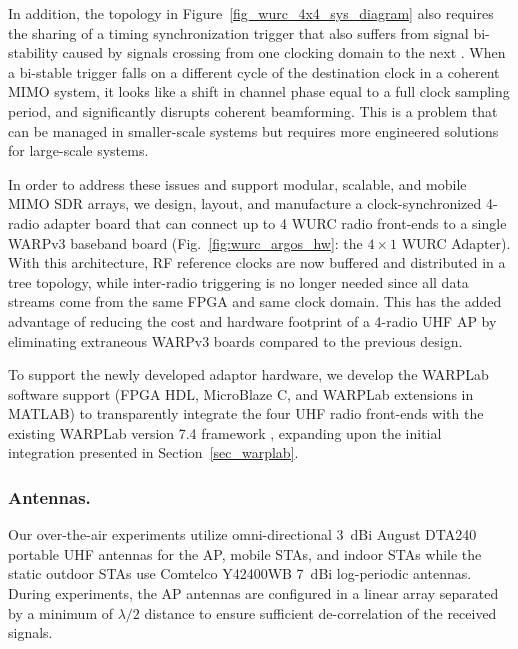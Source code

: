 	In addition, the topology in Figure~\ref{fig_wurc_4x4_sys_diagram} also requires the sharing of a timing synchronization trigger that also suffers from signal bi-stability caused by signals crossing from one clocking domain to the next \cite{cummings2008clock}.
	When a bi-stable trigger falls on a different cycle of the destination clock in a coherent \ac{MIMO} system, it looks like a shift in channel phase equal to a full clock sampling period, and significantly disrupts coherent beamforming.
	This is a problem that can be managed in smaller-scale systems but requires more engineered solutions for large-scale systems.

	In order to address these issues and support modular, scalable, and mobile \ac{MIMO} \ac{SDR} arrays, we design, layout, and manufacture a clock-synchronized 4-radio adapter board that can connect up to 4 \ac{WURC} radio front-ends to a single WARPv3 baseband board (Fig.~\ref{fig:wurc_argos_hw}: the $4\times1$ WURC Adapter).
	With this architecture, RF reference clocks are now buffered and distributed in a tree topology, while inter-radio triggering is no longer needed since all data streams come from the same \ac{FPGA} and same clock domain.
	This has the added advantage of reducing the cost and hardware footprint of a 4-radio UHF \ac{AP} by eliminating extraneous WARPv3 boards compared to the previous design.
	
	To support the newly developed adaptor hardware, we develop the WARPLab software support (FPGA HDL, MicroBlaze C, and WARPLab extensions in MATLAB) to transparently integrate the four UHF radio front-ends with the existing WARPLab version 7.4 framework \cite{warpProject}, expanding upon the initial integration presented in Section~\ref{sec_warplab}.

\subsubsection{Antennas.}
\label{sec_8x8_antennas}

	Our over-the-air experiments utilize omni-directional 3~dBi August DTA240 portable UHF antennas for the \ac{AP}, mobile \acp{STA}, and indoor \acp{STA} while the static outdoor \acp{STA} use Comtelco Y42400WB 7~dBi log-periodic antennas.
	During experiments, the \ac{AP} antennas are configured in a linear array separated by a minimum of $\lambda/2$ distance to ensure sufficient de-correlation of the received signals.


%

